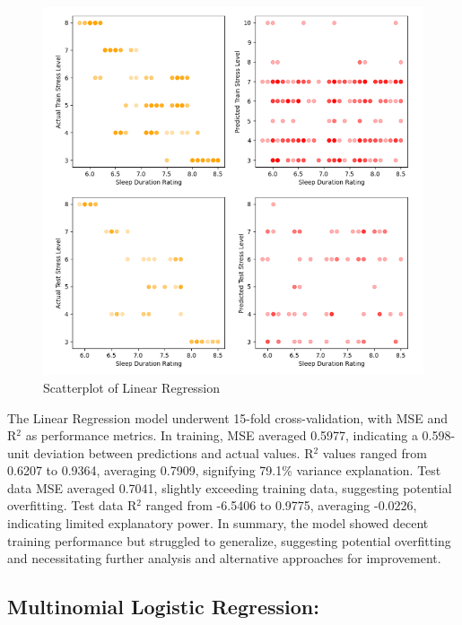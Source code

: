 \documentclass[11pt, letterpaper]{article}
\begin{document}
    \begin{figure}[H]
        \centering
        \includegraphics[width=\columnwidth]{lr-scatterplot.png}
        \caption{Scatterplot of Linear Regression}
        \label{fig:scatterplot-lr}
    \end{figure}

    \noindent The Linear Regression model underwent 15-fold cross-validation, with MSE and  R{$^2$} as performance metrics. In training, MSE averaged 0.5977, indicating a 0.598-unit deviation between predictions and actual values. R${^2}$ values ranged from 0.6207 to 0.9364, averaging 0.7909, signifying 79.1\% variance explanation. Test data MSE averaged 0.7041, slightly exceeding training data, suggesting potential overfitting. Test data R${^2}$ ranged from -6.5406 to 0.9775, averaging -0.0226, indicating limited explanatory power. 
    \noindent In summary, the model showed decent training performance but struggled to generalize, suggesting potential overfitting and necessitating further analysis and alternative approaches for improvement.
    
    \noindent\subsection*{Multinomial Logistic Regression:}
    
\end{document}
